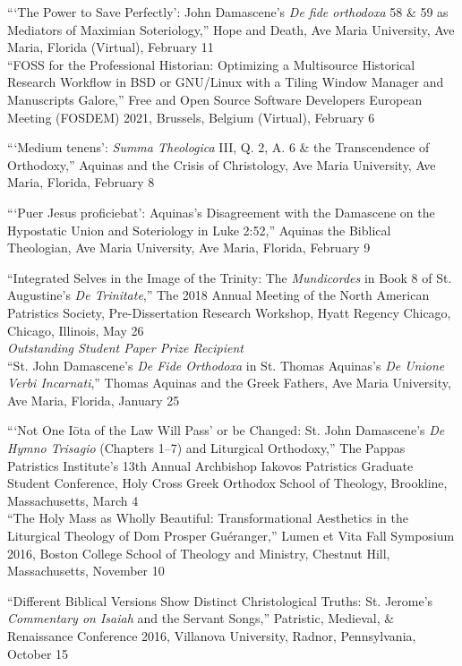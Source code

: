 \documentclass[letterpaper,12pt]{article}
\newcommand{\years}[1]{%
  {\reversemarginpar\strut\marginnote{{\small#1}}}%
}
\begin{document}
{{{{{{{%
```The Power to Save Perfectly': John Damascene's \emph{De fide orthodoxa} 58 \& 59 as Mediators of Maximian Soteriology,'' Hope and Death, Ave Maria University, Ave Maria, Florida (Virtual), February 11 \\ [.3cm]
%
``FOSS for the Professional Historian: Optimizing a Multisource Historical Research Workflow in BSD or GNU/Linux with a Tiling Window Manager and Manuscripts Galore,'' Free and Open Source Software Developers European Meeting (FOSDEM) 2021, Brussels, Belgium (Virtual), February 6 \\ [.3cm]
%
\years{2020}%
%
```Medium tenens': \emph{Summa Theologica} III, Q. 2, A. 6 \& the Transcendence of Orthodoxy,'' Aquinas and the Crisis of Christology, Ave Maria University, Ave Maria, Florida, February 8 \\ [.3cm]
%
\years{2019}%
%
```Puer Jesus proficiebat': Aquinas's Disagreement with the Damascene on the Hypostatic Union and Soteriology in Luke 2:52,'' Aquinas the Biblical Theologian, Ave Maria University, Ave Maria, Florida, February 9 \\ [.3cm]
%
\years{2018}%
%
``Integrated Selves in the Image of the Trinity: The \emph{Mundicordes} in Book 8 of St. Augustine's \emph{De Trinitate},'' The 2018 Annual Meeting of the North American Patristics Society, Pre-Dissertation Research Workshop, Hyatt Regency Chicago, Chicago, Illinois, May 26 \\
\hfill\emph{Outstanding Student Paper Prize Recipient} \\ [.3cm]
%
``St. John Damascene's \emph{De Fide Orthodoxa} in St. Thomas Aquinas's \emph{De Unione Verbi Incarnati},'' Thomas Aquinas and the Greek Fathers, Ave Maria University, Ave Maria, Florida, January 25 \\ [.3cm]
%
\years{2017}%
%
```Not One I\=ota of the Law Will Pass' or be Changed: St. John Damascene's \emph{De Hymno Trisagio} (Chapters 1–7) and Liturgical Orthodoxy,” The Pappas Patristics Institute's 13th Annual Archbishop Iakovos Patristics Graduate Student Conference, Holy Cross Greek Orthodox School of Theology, Brookline, Massachusetts, March 4 \\ [.3cm]
%
``The Holy Mass as Wholly Beautiful: Transformational Aesthetics in the Liturgical Theology of Dom Prosper Guéranger,'' Lumen et Vita Fall Symposium 2016, Boston College School of Theology and Ministry, Chestnut Hill, Massachusetts, November 10 \\ [.3cm]
%
\years{2016}%
%
``Different Biblical Versions Show Distinct Christological Truths: St. Jerome's \emph{Commentary on Isaiah} and the Servant Songs,'' Patristic, Medieval, \& Renaissance Conference 2016, Villanova University, Radnor, Pennsylvania, October 15 \\ [.3cm]
}}}}}}}
\end{document}
